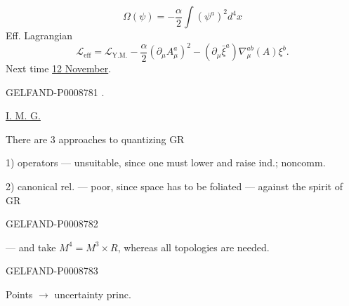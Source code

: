\begin{equation*}
\Omega(\psi)=-\frac\alpha2\int(\psi^a)^2d^4x
\tag{62}
\end{equation*}
Eff. Lagrangian
\begin{equation*}
\mathcal L_{\mathrm{eff}}=\mathcal L_{\mathrm{Y.M.}}-\frac\alpha2(\partial_\mu A_\mu^a)^2
-(\partial_\mu\bar\xi^a)\nabla_\mu^{ab}(A)\xi^b.
\tag{63}
\end{equation*}
Next time \uline{12 November}.


\begin{GelfandAdjacentEvidence}{GELFAND-P000878}{1}
\quad {}.

\uline{I. M. G.}\qquad {}

There are 3 approaches to quantizing GR

1) operators --- unsuitable, since one must lower and raise ind.; noncomm.

2) canonical  rel. --- poor, since space has to be foliated --- against the spirit of GR
\end{GelfandAdjacentEvidence}
\begin{GelfandAdjacentEvidence}{GELFAND-P000878}{2}


--- and take $M^4=M^3\times R$, whereas all topologies are needed.

\end{GelfandAdjacentEvidence}
\begin{GelfandAdjacentEvidence}{GELFAND-P000878}{3}


\end{GelfandAdjacentEvidence}


Points $\to$ uncertainty princ.


